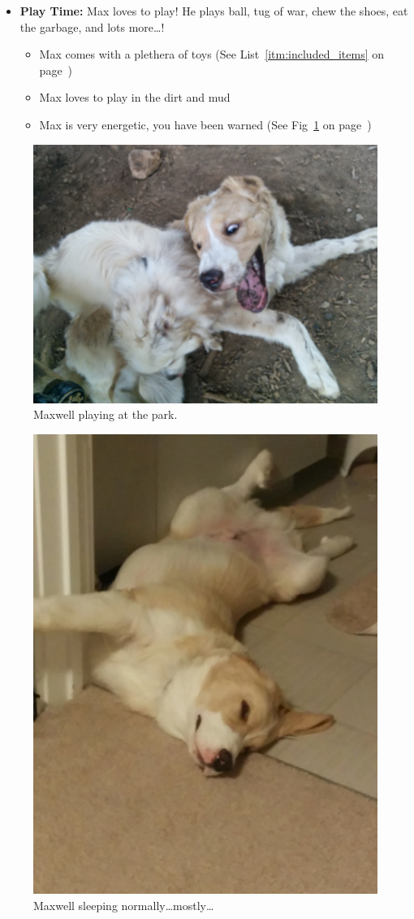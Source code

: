 \documentclass[pdftex,12pt]{article}
\begin{document}
\begin{itemize}
        \begin{itemize}
            \item Each meal consists of 1.5 cups of dog food
                  (See Fig~\ref{fig:food_bowl_filled} on
                  page~\pageref{fig:food_bowl_filled})
            \item Max is trained to wait til eating
                  (See Fig~\ref{fig:food_container_open} on
                  page~\pageref{fig:food_container_open})
            \item Max eats fast, and he must be walked immediatly after dinner
        \end{itemize}
    \item \textbf{Play Time:} Max loves to play! He plays ball, tug of war, chew
        the shoes, eat the garbage, and lots more\ldots!
        \begin{itemize}
            \item Max comes with a plethera of toys
                  (See List~\ref{itm:included_items} on
                  page~\pageref{itm:included_items})
            \item Max loves to play in the dirt and mud
            \item Max is very energetic, you have been warned
                  (See Fig~\ref{fig:at_the_park} on
                  page~\pageref{fig:at_the_park})
        \end{itemize}
\end{itemize}

\bigskip

\begin{figure}[h!]
    \centering
    \includegraphics[width=.35\textwidth]{./images/max/at_the_park.jpg}
    \caption{Maxwell playing at the park.}
    \label{fig:at_the_park}
\end{figure}

\bigskip

\begin{figure}[h!]
    \centering
    \includegraphics[width=.35\textwidth]{./images/max/sleeping.jpg}
    \caption{Maxwell sleeping normally\ldots mostly\ldots}
    \label{fig:sleeping}
\end{figure}
\end{document}
